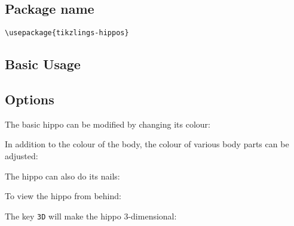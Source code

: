 \documentclass[parskip=half]{scrartcl}
\begin{document}
\subsection{Package name}

\begin{tcolorbox}[lower separated=false, lefthand width=.8\linewidth]
\vspace*{0.5cm}
\lstinline|\usepackage{tikzlings-hippos}| 
\vspace*{0.5cm}
\end{tcolorbox}

\subsection{Basic Usage}

\begin{tcblisting}{}
\hippo
\end{tcblisting}

\subsection{Options}

The basic hippo can be modified by changing its colour:
\begin{tcblisting}{}
\hippo[body=blue]
\end{tcblisting}

In addition to the colour of the body, the colour of various body parts can be adjusted:
\begin{tcblisting}{}
\hippo[eye=red]
\end{tcblisting}
\begin{tcblisting}{}
\hippo[pupil=red]
\end{tcblisting}
\begin{tcblisting}{}
\hippo[mouth=red]
\end{tcblisting}

The hippo can also do its nails:
\begin{tcblisting}{}
\hippo[toes=red]
\end{tcblisting}

To view the hippo from behind:
\begin{tcblisting}{}
\hippo[back]
\end{tcblisting}

The key \lstinline|3D| will make the hippo 3-dimensional:
\begin{tcblisting}{}
\hippo[3D]
\end{tcblisting}
\end{document}
